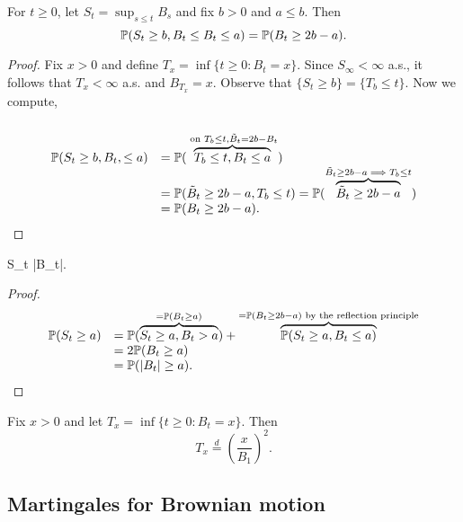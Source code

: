 \documentclass{article}
\begin{document}
\begin{boxcor}\label{cor: bm reflection principle}
For $ t\geq 0$, let $ S_{t} = \displaystyle\sup_{s\leq t}B_{s}$ and fix $ b>0$ and $ a\leq b$. Then 
\[
\mathbb{P}(S_{t}\geq b, B_{t}\leq B_{t}\leq a) = \mathbb{P}(B_{t}\geq 2b-a).
\]
\end{boxcor}

\begin{proof}
	Fix $ x>0$ and define $ T_{x} = \displaystyle\inf\{t\geq 0: B_{t} = x\}$. Since $ S_{\infty}<\infty$ a.s., it follows that $ T_{x}<\infty$ a.s. and $ B_{T_{x}} = x$. Observe that $ \{S_{t}\geq b\} = \{T_{b}\leq t\}$. Now we compute, 
	\[
	\begin{array}{ll}
	    \\
	    \mathbb{P}(S_{t}\geq b, B_{t}, \leq a) &= \mathbb{P}(\overbrace{T_{b}\leq t, B_{t}\leq a}^{\text{ on } T_{b}\leq t, \tilde{B}_{t} = 2b-B_{t}})\\ 
					    &= \mathbb{P}(\tilde{B}_{t}\geq 2b-a, T_{b}\leq t)=\mathbb{P}(\overbrace{\tilde{B}_{t}\geq 2b-a}^{ \tilde{B}_{t}\geq 2b-a \implies T_{b}\leq t})\\ 
				& = \mathbb{P}(B_{t}\geq 2b-a).
	\end{array}
	\]
\end{proof}

\begin{boxcor}\label{cor: bm dist of running max}
	S_{t}  |B_{t}|.
\end{boxcor}

\begin{proof}
	\[
	\begin{array}{ll}
		\mathbb{P}(S_{t}\geq a) &= \mathbb{P}(\overbrace{S_{t}\geq a, B_{t}>a}^{=\mathbb{P}(B_{t}\geq a)})+\overbrace{\mathbb{P}(S_{t}\geq a, B_{t}\leq a)}^{=\mathbb{P}(B_{t}\geq 2b-a) \text{ by the reflection principle}} \\
	     &= 2\mathbb{P}(B_{t}\geq a)\\ 
	     &= \mathbb{P}(|B_{t}|\geq a).
	\end{array}
	\]
\end{proof}

\begin{boxcor}\label{cor: bm hitting time distribution}
	Fix $ x>0$ and let $ T_{x} = \displaystyle\inf\{t\geq 0 : B_{t}=x\}$. Then 
	\[
		T_{x} \stackrel{d}{=} \left( \frac{x}{B_{1}} \right)^{2}.
	\]
\end{boxcor}

\subsection{Martingales for Brownian motion}
\end{document}
